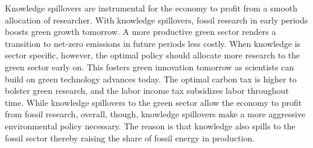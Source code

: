 Knowledge spillovers are instrumental for the economy to profit from a smooth allocation of researcher. With knowledge spillovers, fossil research in early periods boosts green growth tomorrow. A more productive green sector renders a transition to net-zero emissions in future periods less costly. When knowledge is sector specific, however, the optimal policy should allocate more research to the green sector early on. This fosters green innovation tomorrow as scientists can build on green technology advances today. The optimal carbon tax is higher to bolster green research, and the labor income tax subsidizes labor throughout time. While knowledge spillovers to the green sector allow the economy to profit from fossil research, overall, though, knowledge spillovers make a more aggressive environmental policy necessary. The reason is that knowledge also spills to the fossil sector thereby raising the share of fossil energy in production.  %


